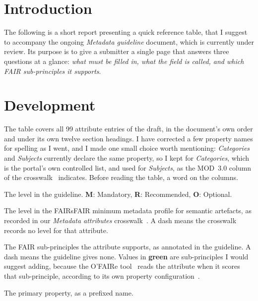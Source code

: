 \documentclass[10pt,a4paper]{article}
\newcommand{\added}[1]{\textcolor{dtteal}{\textbf{#1}}}
\begin{document}
\makereporttitlepage

\section{Introduction}

The following is a short report presenting a quick reference table, that I suggest
to accompany the ongoing \textit{Metadata guideline} document, which is currently under review.
Its purpose is to give a submitter a single page that answers three questions at a glance: 
\textit{what must be filled in, what the field is called, and which FAIR sub-principles it supports}.

\section{Development}

The table covers all 99 attribute entries of the draft, in the document's own order and under its
own twelve section headings. I have corrected a few property names for spelling as I went, and I
made one small choice worth mentioning: \textit{Categories} and \textit{Subjects} currently declare
the same property, so I kept  for \textit{Categories}, which is the portal's own
controlled list, and used  for \textit{Subjects}, as the MOD~3.0 column of the
crosswalk~\cite{crosswalk2026} indicates. Before reading the table, a word on the columns.

\begin{description}[leftmargin=2.5cm,style=nextline,font=\normalfont\bfseries]
  \item[Usage] The level in the guideline. \textbf{M}: Mandatory, \textbf{R}: Recommended,
    \textbf{O}: Optional.
  \item[FsF] The level in the FAIRsFAIR minimum metadata profile for semantic artefacts, as
    recorded in our \textit{Metadata attributes} crosswalk~\cite{crosswalk2026}. A dash means the
    crosswalk records no level for that attribute.
  \item[FAIR] The FAIR sub-principles the attribute supports, as annotated in the guideline.
    A dash means the guideline gives none. Values in \added{green} are sub-principles I would
    suggest adding, because the O'FAIRe tool~\cite{amdouni2022faire} reads the attribute when it scores that
    sub-principle, according to its own property configuration~\cite{ofaireconfig}.
  \item[Property] The primary property, as a prefixed name.
\end{description}
\end{document}
